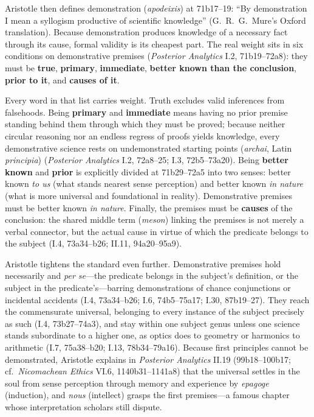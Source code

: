Aristotle then defines demonstration (\emph{apodeixis}) at 71b17--19: ``By demonstration I mean a syllogism productive of scientific knowledge'' (G.\ R.\ G.\ Mure's Oxford translation). Because demonstration produces knowledge of a necessary fact through its cause, formal validity is its cheapest part. The real weight sits in six conditions on demonstrative premises (\emph{Posterior Analytics} I.2, 71b19--72a8): they must be \textbf{true}, \textbf{primary}, \textbf{immediate}, \textbf{better known than the conclusion}, \textbf{prior to it}, and \textbf{causes of it}.

Every word in that list carries weight. Truth excludes valid inferences from falsehoods. Being \textbf{primary} and \textbf{immediate} means having no prior premise standing behind them through which they must be proved; because neither circular reasoning nor an endless regress of proofs yields knowledge, every demonstrative science rests on undemonstrated starting points (\emph{archai}, Latin \emph{principia}) (\emph{Posterior Analytics} I.2, 72a8--25; I.3, 72b5--73a20). Being \textbf{better known} and \textbf{prior} is explicitly divided at 71b29--72a5 into two senses: better known \emph{to us} (what stands nearest sense perception) and better known \emph{in nature} (what is more universal and foundational in reality). Demonstrative premises must be better known \emph{in nature}. Finally, the premises must be \textbf{causes} of the conclusion: the shared middle term (\emph{meson}) linking the premises is not merely a verbal connector, but the actual cause in virtue of which the predicate belongs to the subject (I.4, 73a34--b26; II.11, 94a20--95a9).

Aristotle tightens the standard even further. Demonstrative premises hold necessarily and \emph{per se}---the predicate belongs in the subject's definition, or the subject in the predicate's---barring demonstrations of chance conjunctions or incidental accidents (I.4, 73a34--b26; I.6, 74b5--75a17; I.30, 87b19--27). They reach the commensurate universal, belonging to every instance of the subject precisely as such (I.4, 73b27--74a3), and stay within one subject genus unless one science stands subordinate to a higher one, as optics does to geometry or harmonics to arithmetic (I.7, 75a38--b20; I.13, 78b34--79a16). Because first principles cannot be demonstrated, Aristotle explains in \emph{Posterior Analytics} II.19 (99b18--100b17; cf.\ \emph{Nicomachean Ethics} VI.6, 1140b31--1141a8) that the universal settles in the soul from sense perception through memory and experience by \emph{epagoge} (induction), and \emph{nous} (intellect) grasps the first premises---a famous chapter whose interpretation scholars still dispute.

